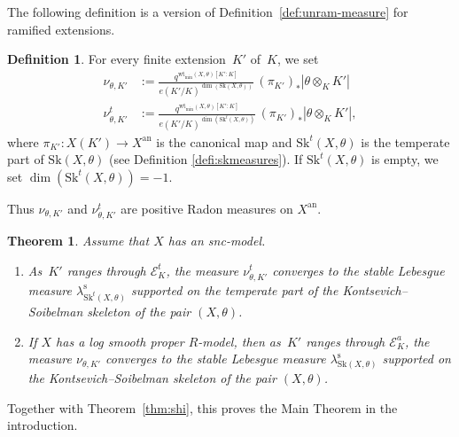 \documentclass[JEP,XML,SOM,Unicode,NoFloatCountersInSection]{cedram}
\let\mathcal\mathscr
\newtheorem{theorem}[equation]{Theorem}
\theoremstyle{definition}
\newtheorem{definition}[equation]{Definition}
\numberwithin{equation}{subsection}
\newcommand{\snc}{\textit{snc}}
\newcommand{\an}{\mathrm{an}}
\newcommand{\Sk}{\mathrm{Sk}}
\newcommand{\rs}{\mathrm{s}}
\newcommand{\wt}{\mathrm{wt}}
\let\form\theta
\let\Leb\lambda
\begin{document}
The following definition is a version of Definition~\ref{def:unram-measure} for ramified extensions.
\begin{definition}\label{def:ram-measure}
For every finite extension~$K'$ of~$K$, we set\enlargethispage{.5\baselineskip}%
\begin{align*}
\nu_{\form,K'}&:=\frac{q^{\wt_{\min}(X,\form)[K' \colon K]}}{e(K'/K)^{\dim(\Sk(X,\form))}}\,
(\pi_{K'})_*|\form\otimes_K K'|\\
\tag*{and}
\nu^t_{\form,K'}&:=\frac{q^{\wt_{\min}(X,\form)[K' \colon K]}}{e(K'/K)^{\dim(\Sk^t(X,\form))}}\,
(\pi_{K'})_*|\form\otimes_K K'|,
\end{align*}
where $\pi_{K'}\colon X(K')\to X^{\an}$ is the canonical map and $\Sk^t(X,\form)$ is the temperate part of $\Sk(X,\form)$ (see Definition \ref{defi:skmeasures}). If $\Sk^t(X,\form)$ is empty, we set $\dim(\Sk^t(X,\form))=-1$.
\end{definition}
Thus $\nu_{\form,K'}$ and $\nu^t_{\form,K'}$ are positive Radon measures on $X^{\an}$.

\begin{theorem}\label{thm:padic}
Assume that $X$ has an \snc-model.
\begin{enumerate}
\item \label{it:maintame} As~$K'$ ranges through $\mathcal{E}^t_K$, the measure $\nu^t_{\form,K'}$
converges to the stable Lebesgue measure $\Leb^{\rs}_{\Sk^t(X,\form)}$
supported on the temperate part of the Kontsevich--Soibelman skeleton of the pair $(X,\form)$.
\item \label{it:mainwild} If $X$ has a log smooth proper $R$\nobreakdash-model, then as~$K'$ ranges through $\mathcal{E}^a_K$, the measure $\nu_{\form,K'}$
converges to the stable Lebesgue measure $\Leb^{\rs}_{\Sk(X,\form)}$
supported on the Kontsevich--Soibelman skeleton of the pair $(X,\form)$.
\end{enumerate}
\end{theorem}
Together with Theorem~\ref{thm:shi}, this proves the Main Theorem in the introduction.
\end{document}
